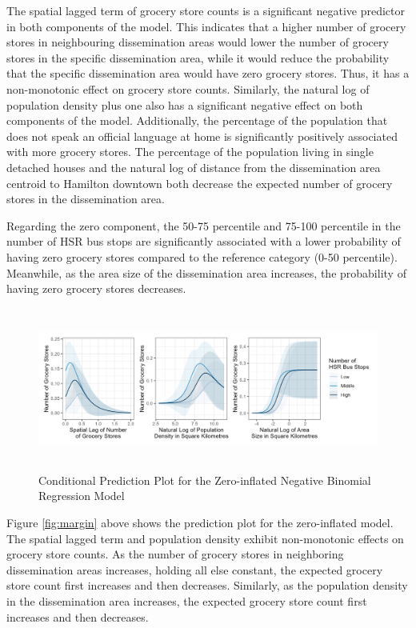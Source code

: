 \documentclass[preprint, 3p,
authoryear]{elsarticle} %
\begin{document}
The spatial lagged term of grocery store counts is a significant
negative predictor in both components of the model. This indicates that
a higher number of grocery stores in neighbouring dissemination areas
would lower the number of grocery stores in the specific dissemination
area, while it would reduce the probability that the specific
dissemination area would have zero grocery stores. Thus, it has a
non-monotonic effect on grocery store counts. Similarly, the natural log
of population density plus one also has a significant negative effect on
both components of the model. Additionally, the percentage of the
population that does not speak an official language at home is
significantly positively associated with more grocery stores. The
percentage of the population living in single detached houses and the
natural log of distance from the dissemination area centroid to Hamilton
downtown both decrease the expected number of grocery stores in the
dissemination area.

Regarding the zero component, the 50-75 percentile and 75-100 percentile
in the number of HSR bus stops are significantly associated with a lower
probability of having zero grocery stores compared to the reference
category (0-50 percentile). Meanwhile, as the area size of the
dissemination area increases, the probability of having zero grocery
stores decreases.

\begin{figure}

{\centering \includegraphics[width=6.3in,height=2.1in]{./images/margin} 

}

\caption{\label{fig:margin}Conditional Prediction Plot for the Zero-inflated Negative Binomial Regression Model}\label{fig:unnamed-chunk-17}
\end{figure}

Figure \ref{fig:margin} above shows the prediction plot for the
zero-inflated model. The spatial lagged term and population density
exhibit non-monotonic effects on grocery store counts. As the number of
grocery stores in neighboring dissemination areas increases, holding all
else constant, the expected grocery store count first increases and then
decreases. Similarly, as the population density in the dissemination
area increases, the expected grocery store count first increases and
then decreases.
\end{document}

